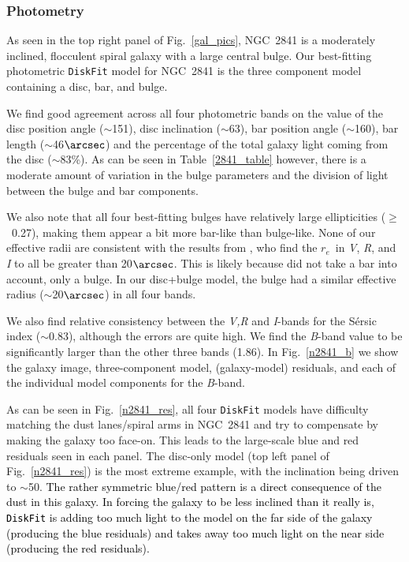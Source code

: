\documentclass[a4paper,fleqn,usenatbib]{mnras}
\newcommand{\authorfix}{\textcolor{black}}
\begin{document}
\subsubsection{Photometry}
\label{sec:n2841phot}

As seen in the top right panel of Fig.~\ref{gal_pics}, NGC~2841 is a moderately inclined, flocculent spiral galaxy with a large central bulge. Our best-fitting photometric \texttt{DiskFit} model for NGC~2841 is the three component model containing a disc, bar, and bulge.

We find good agreement across all four photometric bands on the value of the disc position angle ($\sim$151\degr), disc inclination ($\sim$63\degr), bar position angle ($\sim$160\degr), bar length ($\sim$46$\arcsec$) and the percentage of the total galaxy light coming from the disc ($\sim$83\%).  As can be seen in Table~\ref{2841_table} however, there is a moderate amount of variation in the bulge parameters and the division of light between the bulge and bar components. 

We also note that all four best-fitting bulges have relatively large ellipticities ($\geq$~0.27), making them appear a bit more bar-like than bulge-like. None of our effective radii are consistent with the results from \citet{varela1996}, who find the $r_{e}$\ in \textit{V}, \textit{R}, and \textit{I} to all be greater than 20$\arcsec$. This is likely because \citet{varela1996} did not take a bar into account, only a bulge. In our disc+bulge model, the bulge had a similar effective radius ($\sim$20$\arcsec$) in all four bands.

We also find relative consistency between the \textit{V,R} and \textit{I}-bands for the S\'{e}rsic index ($\sim$0.83), although the errors are quite high. We find the \textit{B}-band value to be significantly larger than the other three bands (1.86). In Fig.~\ref{n2841_b} we show the galaxy image, three-component model, (galaxy-model) residuals, and each of the individual model components for the  \textit{B}-band.

As can be seen in Fig.~\ref{n2841_res}, all four \texttt{DiskFit} models have difficulty matching the dust lanes/spiral arms in NGC~2841 and try to compensate by making the galaxy too face-on. This leads to the large-scale blue and red residuals seen in each panel. The disc-only model (top left panel of Fig.~\ref{n2841_res}) is the most extreme example, with the inclination being driven to $\sim$50\degr. \authorfix{The rather symmetric blue/red pattern is a direct consequence of the dust in this galaxy. In forcing the galaxy to be less inclined than it really is, \texttt{DiskFit} is adding too much light to the model on the far side of the galaxy (producing the blue residuals) and takes away too much light on the near side (producing the red residuals).}
\end{document}
